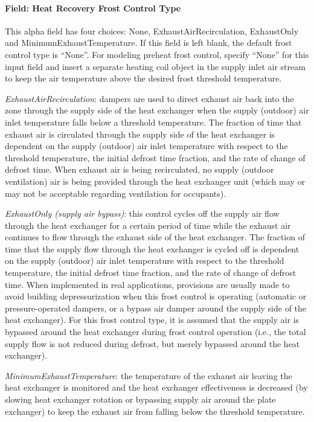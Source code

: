 \paragraph{Field: Heat Recovery Frost Control Type}\label{field-heat-recovery-frost-control-type-3}

This alpha field has four choices: None, ExhaustAirRecirculation, ExhaustOnly and MinimumExhaustTemperature. If this field is left blank, the default frost control type is ``None''. For modeling preheat frost control, specify ``None'' for this input field and insert a separate heating coil object in the supply inlet air stream to keep the air temperature above the desired frost threshold temperature.

\emph{ExhaustAirRecirculation}: dampers are used to direct exhaust air back into the zone through the supply side of the heat exchanger when the supply (outdoor) air inlet temperature falls below a threshold temperature. The fraction of time that exhaust air is circulated through the supply side of the heat exchanger is dependent on the supply (outdoor) air inlet temperature with respect to the threshold temperature, the initial defrost time fraction, and the rate of change of defrost time. When exhaust air is being recirculated, no supply (outdoor ventilation) air is being provided through the heat exchanger unit (which may or may not be acceptable regarding ventilation for occupants).

\emph{ExhaustOnly (supply air bypass)}: this control cycles off the supply air flow through the heat exchanger for a certain period of time while the exhaust air continues to flow through the exhaust side of the heat exchanger. The fraction of time that the supply flow through the heat exchanger is cycled off is dependent on the supply (outdoor) air inlet temperature with respect to the threshold temperature, the initial defrost time fraction, and the rate of change of defrost time. When implemented in real applications, provisions are usually made to avoid building depressurization when this frost control is operating (automatic or pressure-operated dampers, or a bypass air damper around the supply side of the heat exchanger). For this frost control type, it is assumed that the supply air is bypassed around the heat exchanger during frost control operation (i.e., the total supply flow is not reduced during defrost, but merely bypassed around the heat exchanger).

\emph{MinimumExhaustTemperature}: the temperature of the exhaust air leaving the heat exchanger is monitored and the heat exchanger effectiveness is decreased (by slowing heat exchanger rotation or bypassing supply air around the plate exchanger) to keep the exhaust air from falling below the threshold temperature.

